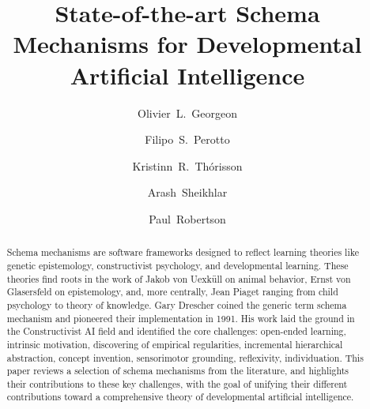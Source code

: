 \documentclass[runningheads]{llncs}
\begin{document}
%
\title{State-of-the-art Schema Mechanisms for Developmental Artificial Intelligence}
%
%
\author{Olivier~L.~Georgeon \and
Filipo~S.~Perotto \and
Kristinn~R.~Th{\'o}risson  \and
Arash~Sheikhlar \and
Paul~Robertson
}
%
%
%
\maketitle              %
%
\begin{abstract}
Schema mechanisms are software frameworks designed to reflect learning theories like 
genetic epistemology, 
constructivist psychology, %
and developmental learning.  
These theories find roots in the work of Jakob von Uexküll on animal behavior, Ernst von Glasersfeld on epistemology, and, more centrally, Jean Piaget ranging from child psychology to theory of knowledge.
Gary Drescher coined the generic term schema mechanism and pioneered their implementation in 1991.
His work laid the ground in the Constructivist AI field and identified the core challenges: open-ended learning, intrinsic motivation, discovering of empirical regularities, incremental hierarchical abstraction, concept invention, sensorimotor grounding, reflexivity, individuation. 
This paper reviews a selection of 
schema mechanisms from the literature,
and highlights their contributions to these key challenges, with the goal of unifying their different contributions toward a comprehensive theory of developmental artificial intelligence.

\end{abstract}
%
%
%
\end{document}
